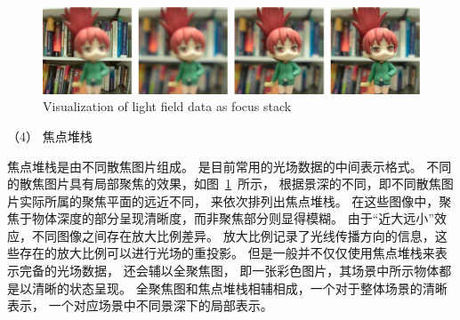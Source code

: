 




\begin{figure}[b]
	\centering
	\includegraphics[width=0.95\linewidth]{figures/chapter2/focal_stack}
	{Visualization of light field data as focus stack}  
	\label{cpt2_fig7:focal_stack}
\end{figure}






（4）
焦点堆栈






焦点堆栈是由不同散焦图片组成。
是目前常用的光场数据的中间表示格式。
不同的散焦图片具有局部聚焦的效果，如图~\ref{cpt2_fig7:focal_stack}~所示，
根据景深的不同，即不同散焦图片实际所属的聚焦平面的远近不同，
来依次排列出焦点堆栈。
在这些图像中，聚焦于物体深度的部分呈现清晰度，而非聚焦部分则显得模糊。
由于“近大远小”效应，不同图像之间存在放大比例差异。
放大比例记录了光线传播方向的信息，这些存在的放大比例可以进行光场的重投影。
但是一般并不仅仅使用焦点堆栈来表示完备的光场数据，
还会辅以全聚焦图，
即一张彩色图片，其场景中所示物体都是以清晰的状态呈现。
全聚焦图和焦点堆栈相辅相成，一个对于整体场景的清晰表示，
一个对应场景中不同景深下的局部表示。






